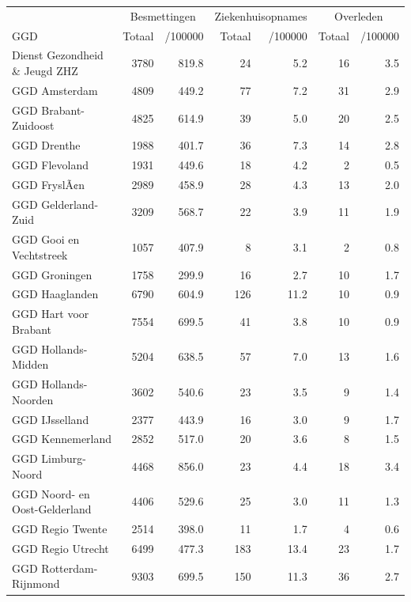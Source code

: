 \documentclass[
  english,
  man,floatsintext]{apa6}
\begin{document}
\begin{table}
\centering\begingroup\fontsize{10}{12}\selectfont

\begin{threeparttable}
\begin{tabular}{lrrrrrr}
\toprule
\multicolumn{1}{c}{ } & \multicolumn{2}{c}{Besmettingen} & \multicolumn{2}{c}{Ziekenhuisopnames} & \multicolumn{2}{c}{Overleden} \\
\cmidrule(l{3pt}r{3pt}){2-3} \cmidrule(l{3pt}r{3pt}){4-5} \cmidrule(l{3pt}r{3pt}){6-7}
GGD & Totaal & /100000 & Totaal & /100000 & Totaal & /100000\\
\midrule
Dienst Gezondheid \& Jeugd ZHZ & 3780 & 819.8 & 24 & 5.2 & 16 & 3.5\\
GGD Amsterdam & 4809 & 449.2 & 77 & 7.2 & 31 & 2.9\\
GGD Brabant-Zuidoost & 4825 & 614.9 & 39 & 5.0 & 20 & 2.5\\
GGD Drenthe & 1988 & 401.7 & 36 & 7.3 & 14 & 2.8\\
GGD Flevoland & 1931 & 449.6 & 18 & 4.2 & 2 & 0.5\\
GGD FryslÃ¢n & 2989 & 458.9 & 28 & 4.3 & 13 & 2.0\\
GGD Gelderland-Zuid & 3209 & 568.7 & 22 & 3.9 & 11 & 1.9\\
GGD Gooi en Vechtstreek & 1057 & 407.9 & 8 & 3.1 & 2 & 0.8\\
GGD Groningen & 1758 & 299.9 & 16 & 2.7 & 10 & 1.7\\
GGD Haaglanden & 6790 & 604.9 & 126 & 11.2 & 10 & 0.9\\
GGD Hart voor Brabant & 7554 & 699.5 & 41 & 3.8 & 10 & 0.9\\
GGD Hollands-Midden & 5204 & 638.5 & 57 & 7.0 & 13 & 1.6\\
GGD Hollands-Noorden & 3602 & 540.6 & 23 & 3.5 & 9 & 1.4\\
GGD IJsselland & 2377 & 443.9 & 16 & 3.0 & 9 & 1.7\\
GGD Kennemerland & 2852 & 517.0 & 20 & 3.6 & 8 & 1.5\\
GGD Limburg-Noord & 4468 & 856.0 & 23 & 4.4 & 18 & 3.4\\
GGD Noord- en Oost-Gelderland & 4406 & 529.6 & 25 & 3.0 & 11 & 1.3\\
GGD Regio Twente & 2514 & 398.0 & 11 & 1.7 & 4 & 0.6\\
GGD Regio Utrecht & 6499 & 477.3 & 183 & 13.4 & 23 & 1.7\\
GGD Rotterdam-Rijnmond & 9303 & 699.5 & 150 & 11.3 & 36 & 2.7\\

\end{tabular}
\end{threeparttable}
\end{table}
\end{document}
